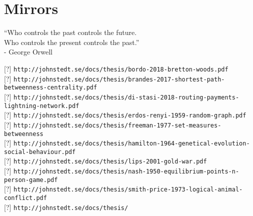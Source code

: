 \chapter{Mirrors}

\begin{displayquote}
	\centering
	“Who controls the past controls the future.
	\\ Who controls the present controls the past.”
	\\ - George Orwell 
	
\end{displayquote}

{\setlength{\parindent}{0cm}

{[?]} \texttt{http://johnstedt.se/docs/thesis/bordo-2018-bretton-woods.pdf} \\ 
{[?]} \texttt{http://johnstedt.se/docs/thesis/brandes-2017-shortest-path-betweenness-centrality.pdf }\\
{[?]} \texttt{http://johnstedt.se/docs/thesis/di-stasi-2018-routing-payments-lightning-network.pdf } \\
{[?]} \texttt{http://johnstedt.se/docs/thesis/erdos-renyi-1959-random-graph.pdf } \\
{[?]} \texttt{http://johnstedt.se/docs/thesis/freeman-1977-set-measures-betweenness } \\
{[?]} \texttt{http://johnstedt.se/docs/thesis/hamilton-1964-genetical-evolution-social-behaviour.pdf }\\
{[?]} \texttt{http://johnstedt.se/docs/thesis/lips-2001-gold-war.pdf } \\
{[?]} \texttt{http://johnstedt.se/docs/thesis/nash-1950-equilibrium-points-n-person-game.pdf } \\
{[?]} \texttt{http://johnstedt.se/docs/thesis/smith-price-1973-logical-animal-conflict.pdf } \\


{[?]} \texttt{http://johnstedt.se/docs/thesis/ } \\
}